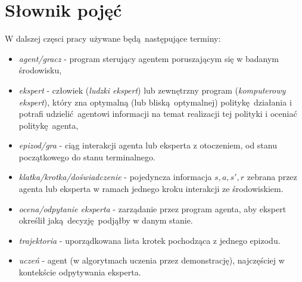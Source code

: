 \section{Słownik pojęć}

W dalszej częsci pracy używane będą następujące terminy:

\begin{itemize}
\item \textit{agent/gracz} - program sterujący agentem poruszającym się w badanym środowisku,
\item \textit{ekspert} - człowiek (\textit{ludzki ekspert}) lub zewnętrzny program (\textit{komputerowy ekspert}), który zna optymalną (lub bliską optymalnej) politykę działania i potrafi udzielić agentowi informacji na temat realizacji tej polityki i oceniać politykę agenta,
\item \textit{epizod/gra} - ciąg interakcji agenta lub eksperta z otoczeniem, od stanu początkowego do stanu terminalnego.
\item \textit{klatka/krotka/doświadczenie} - pojedyncza informacja $s,a,s',r$ zebrana przez agenta lub eksperta w ramach jednego kroku interakcji ze środowiskiem.  
\item \textit{ocena/odpytanie eksperta} - zarządanie przez program agenta, aby ekspert określił jaką decyzję podjąłby w danym stanie.
\item \textit{trajektoria} - uporządkowana lista krotek pochodząca z jednego epizodu.
\item \textit{uczeń} - agent (w algorytmach uczenia przez demonstrację), najczęściej w kontekście odpytywania eksperta.
\end{itemize}
